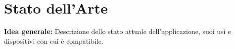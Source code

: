 \chapter{Stato dell'Arte}

\textbf{Idea generale:} Descrizione dello stato attuale dell'applicazione, suoi usi e dispositivi con cui è compatibile.
